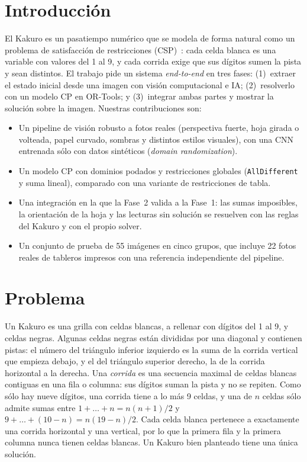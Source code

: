 \documentclass[conference,a4paper]{IEEEtran}
\begin{document}
\section{Introducción}
El Kakuro es un pasatiempo numérico que se modela de forma natural como un problema de satisfacción de restricciones (CSP)~\cite{rossi}:
cada celda blanca es una variable con valores del 1 al 9, y cada corrida exige que sus dígitos sumen la pista y sean distintos.
El trabajo pide un sistema \emph{end-to-end} en tres fases: (1)~extraer el estado inicial desde una imagen con visión computacional e IA;
(2)~resolverlo con un modelo CP en OR-Tools; y (3)~integrar ambas partes y mostrar la solución sobre la imagen. Nuestras contribuciones son:
\begin{itemize}
  \item Un pipeline de visión robusto a fotos reales (perspectiva fuerte, hoja girada o volteada, papel curvado, sombras y distintos
        estilos visuales), con una CNN entrenada sólo con datos sintéticos (\emph{domain randomization}).
  \item Un modelo CP con dominios podados y restricciones globales (\texttt{AllDifferent} y suma lineal), comparado con una variante de
        restricciones de tabla.
  \item Una integración en la que la Fase~2 valida a la Fase~1: las sumas imposibles, la orientación de la hoja y las lecturas sin
        solución se resuelven con las reglas del Kakuro y con el propio solver.
  \item Un conjunto de prueba de 55 imágenes en cinco grupos, que incluye 22 fotos reales de tableros impresos con una referencia
        independiente del pipeline.
\end{itemize}

\section{Problema}
Un Kakuro es una grilla con celdas blancas, a rellenar con dígitos del 1 al 9, y celdas negras. Algunas celdas negras están divididas
por una diagonal y contienen pistas: el número del triángulo inferior izquierdo es la suma de la corrida vertical que empieza debajo,
y el del triángulo superior derecho, la de la corrida horizontal a la derecha. Una \emph{corrida} es una secuencia maximal de celdas
blancas contiguas en una fila o columna: sus dígitos suman la pista y no se repiten. Como sólo hay nueve dígitos, una corrida tiene a lo
más 9 celdas, y una de $n$ celdas sólo admite sumas entre $1+\dots+n=n(n+1)/2$ y $9+\dots+(10-n)=n(19-n)/2$. Cada celda blanca
pertenece a exactamente una corrida horizontal y una vertical, por lo que la primera fila y la primera columna nunca tienen celdas
blancas. Un Kakuro bien planteado tiene una única solución.
\end{document}
